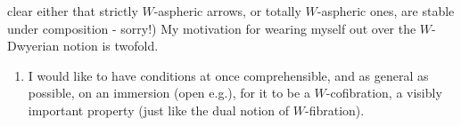 \documentclass[11pt]{article}
\newcommand{\msp}[1]{\marginpar{\footnotesize [#1]}}
\begin{document}
\msp{page 114}

clear either that strictly $W$-aspheric arrows, or totally $W$-aspheric ones, are stable under composition - sorry!) My motivation for wearing myself out over the $W$-Dwyerian notion is twofold.

\begin{enumerate}[label=\alph*)]
\item I would like to have conditions at once comprehensible, and as general as possible, on an immersion (open e.g.), for it to be a $W$-cofibration, a visibly important property (just like the dual notion of $W$-fibration). %
\end{enumerate}
\end{document}
